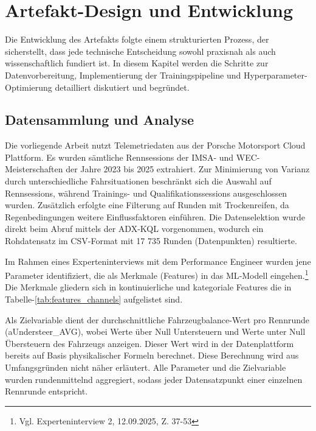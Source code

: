 \chapter{Artefakt-Design und Entwicklung}

Die Entwicklung des Artefakts folgte einem strukturierten Prozess, der sicherstellt, dass jede technische Entscheidung sowohl praxisnah als auch wissenschaftlich fundiert ist. In diesem Kapitel werden die Schritte zur Datenvorbereitung, Implementierung der Trainingspipeline und Hyperparameter-Optimierung detailliert diskutiert und begründet.

\section{Datensammlung und Analyse}

  Die vorliegende Arbeit nutzt Telemetriedaten aus der Porsche Motorsport Cloud Plattform. Es wurden sämtliche Rennsessions der \ac{IMSA}- und \ac{WEC}-Meisterschaften der Jahre 2023 bis 2025 extrahiert. Zur Minimierung von Varianz durch unterschiedliche Fahrsituationen beschränkt sich die Auswahl auf Rennsessions, während Trainings- und Qualifikationssessions ausgeschlossen wurden. Zusätzlich erfolgte eine Filterung auf Runden mit Trockenreifen, da Regenbedingungen weitere Einflussfaktoren einführen. Die Datenselektion wurde direkt beim Abruf mittels der ADX-\ac{KQL} vorgenommen, wodurch ein Rohdatensatz im CSV-Format mit 17 735 Runden (Datenpunkten) resultierte.

  Im Rahmen eines Experteninterviews mit dem Performance Engineer wurden jene Parameter identifiziert, die als Merkmale (Features) in das \ac{ML}-Modell eingehen.\footnote{Vgl. Experteninterview 2, 12.09.2025, Z. 37-53} Die Merkmale gliedern sich in kontinuierliche und kategoriale Features die in Tabelle-\ref{tab:features_channels} aufgelistet sind.



  Als Zielvariable dient der durchschnittliche Fahrzeugbalance-Wert pro Rennrunde (aUndersteer\_AVG), wobei Werte über Null Untersteuern und Werte unter Null Übersteuern des Fahrzeugs anzeigen. Dieser Wert wird in der Datenplattform bereits auf Basis physikalischer Formeln berechnet. Diese Berechnung wird aus Umfangsgründen nicht näher erläutert. Alle Parameter und die Zielvariable wurden rundenmittelnd aggregiert, sodass jeder Datensatzpunkt einer einzelnen Rennrunde entspricht.

